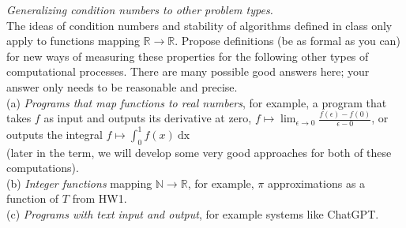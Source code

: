 \documentclass[11pt]{article}
\newenvironment{problem}[2][Question]{\begin{trivlist}
\item[\hskip \labelsep {\bfseries #1}\hskip \labelsep {\bfseries #2.}]}{\end{trivlist}}
\theoremstyle{definition}
\begin{document}
\begin{problem}{3}
{\it Generalizing condition numbers to other problem types.}\\
The ideas of condition numbers and stability of algorithms defined in class only apply to functions mapping $\mathbb{R}\rightarrow \mathbb{R}$. Propose definitions (be as formal as you can) for new ways of measuring these properties for the following other types of computational processes. There are many possible good answers here; your answer only needs to be reasonable and precise.\\[6pt]
(a) {\it Programs that map functions to real numbers}, for example, a program that takes $f$ as input and outputs its derivative at zero, $f\mapsto \lim_{\epsilon\rightarrow 0}\frac{f(\epsilon)-f(0)}{\epsilon-0}$, or outputs the integral $f\mapsto \int^1_0 f(x)\ \mathrm{dx}$ \\
(later in the term, we will develop some very good approaches for both of these computations).\\[6pt]
(b) {\it Integer functions} mapping $\mathbb{N} \rightarrow \mathbb{R}$, for example, $\pi$ approximations as a function of $T$ from HW1.\\[6pt]
(c) {\it Programs with text input and output}, for example systems like ChatGPT.
\end{problem}
\end{document}
